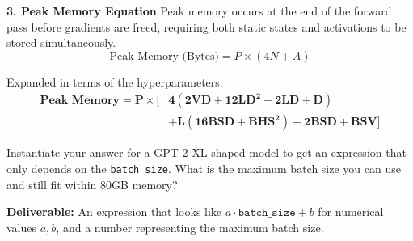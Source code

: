 \begin{answerbox}
    \textbf{3. Peak Memory Equation}
    Peak memory occurs at the end of the forward pass before gradients are freed, requiring both static states and activations to be stored simultaneously.
    $$ \text{Peak Memory (Bytes)} = P \times (4N + A) $$

    Expanded in terms of the hyperparameters:
    \[
        \begin{aligned}
            \textbf{Peak Memory}
            = \mathbf{P \times \Big[} & \mathbf{4(2VD + 12LD^2 + 2LD + D)} \\
                                      & \mathbf{+ L(16BSD + BHS^2) + 2BSD + BSV \Big]}
        \end{aligned}
    \]

\end{answerbox}

\begin{questionbox}
    Instantiate your answer for a GPT-2 XL-shaped model to get an expression that only depends on the \texttt{batch\_size}. What is the maximum batch size you can use and still fit within 80GB memory?

    \textbf{Deliverable:} An expression that looks like $a \cdot \texttt{batch\_size} + b$ for numerical values $a, b$, and a number representing the maximum batch size.
\end{questionbox}

